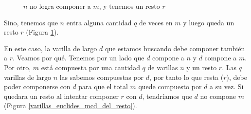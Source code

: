 \documentclass[12pt, a4paper, openany, fleqn]{book}
\begin{document}
    \begin{figure}[h]
        \centering
        \caption{$n$ no logra componer a $m$, y tenemos un resto $r$} \label{varillas_euclides_resto}
    \end{figure}

    Sino, tenemos que $n$ entra alguna cantidad $q$ de veces en $m$ y luego queda un resto $r$ (Figura \ref{varillas_euclides_resto}).

    En este caso, la varilla de largo $d$ que estamos buscando debe componer también a $r$. Veamos por qué. Tenemos por un lado que $d$ compone a $n$ y $d$ compone a $m$. Por otro, $m$ está compuesta por una cantidad $q$ de varillas $n$ y un resto $r$.
    Las $q$ varillas de largo $n$ las sabemos compuestas por $d$, por tanto lo que resta ($r$), debe poder componerse con $d$ para que el total $m$ quede compuesto por $d$ a su vez. Si quedara un resto al intentar componer $r$ con $d$, tendríamos que $d$ no compone $m$ (Figura \ref{varillas_euclides_mcd_del_resto}).
\end{document}
